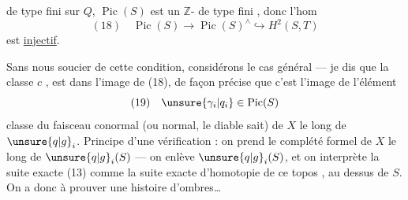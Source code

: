 de type fini sur $Q$, $\operatorname{Pic}(S)$ est un $\mathbb Z$- de type fini , donc l'hom
\[
(18)\quad \operatorname{Pic}(S)\longrightarrow\operatorname{Pic}(S)^\wedge\hookrightarrow H^2(S,T)
\]
est \uline{injectif}.

Sans nous soucier de cette condition,  considérons le cas général --- je dis que la classe  $c$ , est dans l'image de (18), de façon précise que c'est l'image de l'élément
\[
(19)\quad \unsure{\gamma_i|q_i}\in\operatorname{Pic}(S)
\]
classe du faisceau conormal (ou normal, le diable sait) de $X$ le long de $\unsure{q|g}_i$. Principe d'une vérification : on prend le complété formel de $X$ le long de $\unsure{q|g}_i(S)$    --- on enlève $\unsure{q|g}_i(S)$, et on interprète la suite exacte (13) comme la suite exacte d'homotopie de ce  topos , au dessus de  $S$. On a donc à prouver une histoire d'ombres\dots
{}
